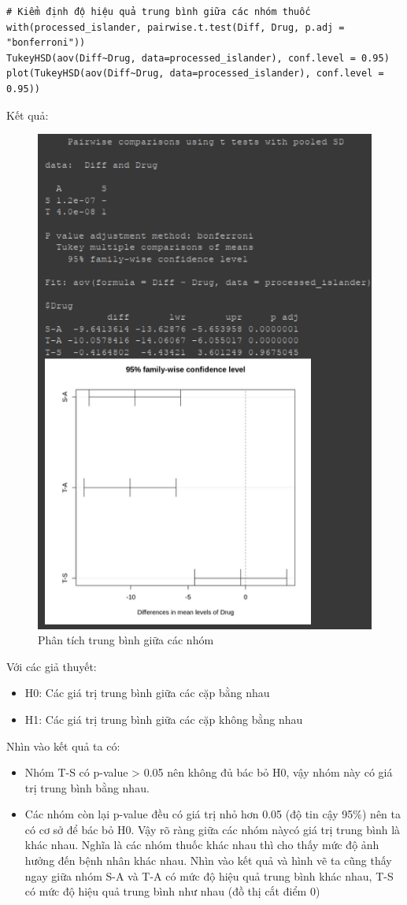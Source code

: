 \begin{itemize}
\begin{lstlisting}
# Kiểm định độ hiệu quả trung bình giữa các nhóm thuốc
with(processed_islander, pairwise.t.test(Diff, Drug, p.adj = "bonferroni"))
TukeyHSD(aov(Diff~Drug, data=processed_islander), conf.level = 0.95)
plot(TukeyHSD(aov(Diff~Drug, data=processed_islander), conf.level = 0.95))
\end{lstlisting}
Kết quả:
\begin{figure}[H]
    \centering
    \includegraphics[width=0.7\linewidth]{part01_figures/18.png}
    \caption{Phân tích trung bình giữa các nhóm}
    \label{fig:Phân tích trung bình giữa các nhóm}
\end{figure}
Với các giả thuyết:
    \begin{itemize}
        \item H0: Các giá trị trung bình giữa các cặp bằng nhau
        \item H1: Các giá trị trung bình giữa các cặp không bằng nhau
    \end{itemize}
    Nhìn vào kết quả ta có:
    \begin{itemize}
        \item Nhóm T-S có p-value > 0.05 nên không đủ bác bỏ H0, vậy nhóm này có giá trị trung bình bằng nhau.
        \item Các nhóm còn lại p-value đều có giá trị nhỏ hơn 0.05 (độ tin cậy 95\%) nên ta có cơ sở để bác bỏ H0. Vậy rõ ràng giữa các nhóm nàycó giá trị trung bình là khác nhau. Nghĩa là các nhóm thuốc khác nhau thì cho thấy mức độ ảnh hưởng đến bệnh nhân khác nhau. Nhìn vào kết quả và hình vẽ ta cũng thấy ngay giữa nhóm S-A và T-A có mức độ hiệu quả trung bình khác nhau, T-S có mức độ hiệu quả trung bình như nhau (đồ thị cắt điểm 0)
    \end{itemize}
\end{itemize}
